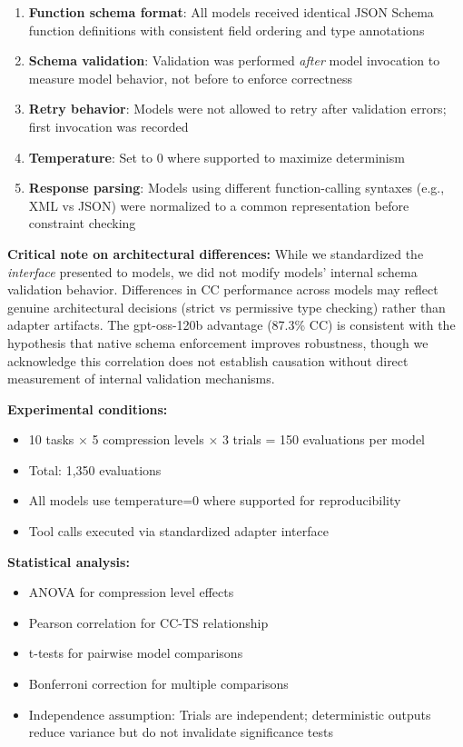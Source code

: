 \documentclass[11pt]{article}
\begin{document}
\begin{enumerate}
\item \textbf{Function schema format}: All models received identical JSON Schema function definitions with consistent field ordering and type annotations
\item \textbf{Schema validation}: Validation was performed \emph{after} model invocation to measure model behavior, not before to enforce correctness
\item \textbf{Retry behavior}: Models were not allowed to retry after validation errors; first invocation was recorded
\item \textbf{Temperature}: Set to 0 where supported to maximize determinism
\item \textbf{Response parsing}: Models using different function-calling syntaxes (e.g., XML vs JSON) were normalized to a common representation before constraint checking
\end{enumerate}

\textbf{Critical note on architectural differences:} While we standardized the \emph{interface} presented to models, we did not modify models' internal schema validation behavior. Differences in CC performance across models may reflect genuine architectural decisions (strict vs permissive type checking) rather than adapter artifacts. The gpt-oss-120b advantage (87.3\% CC) is consistent with the hypothesis that native schema enforcement improves robustness, though we acknowledge this correlation does not establish causation without direct measurement of internal validation mechanisms.

\textbf{Experimental conditions:}
\begin{itemize}
\item 10 tasks $\times$ 5 compression levels $\times$ 3 trials = 150 evaluations per model
\item Total: 1,350 evaluations
\item All models use temperature=0 where supported for reproducibility
\item Tool calls executed via standardized adapter interface
\end{itemize}

\textbf{Statistical analysis:}
\begin{itemize}
\item ANOVA for compression level effects
\item Pearson correlation for CC-TS relationship
\item t-tests for pairwise model comparisons
\item Bonferroni correction for multiple comparisons
\item Independence assumption: Trials are independent; deterministic outputs reduce variance but do not invalidate significance tests
\end{itemize}
\end{document}

